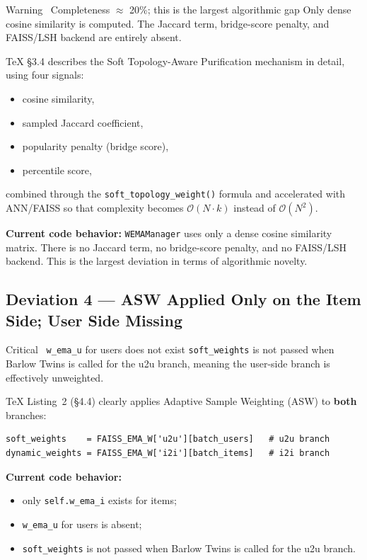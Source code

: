 \documentclass[11pt,a4paper]{article}
\begin{document}
\begin{warnbox}{Warning \textemdash\ Completeness $\approx$ 20\%; this is the largest algorithmic gap}
Only dense cosine similarity is computed. The Jaccard term, bridge-score penalty,
and FAISS/LSH backend are entirely absent.
\end{warnbox}

\TeX{} \S3.4 describes the Soft Topology-Aware Purification mechanism in detail, using four signals:
\begin{itemize}[leftmargin=1.5em, itemsep=2pt]
\item cosine similarity,
\item sampled Jaccard coefficient,
\item popularity penalty (bridge score),
\item percentile score,
\end{itemize}
combined through the \texttt{soft\_topology\_weight()} formula and accelerated with ANN/FAISS so that complexity becomes $\mathcal{O}(N \cdot k)$ instead of $\mathcal{O}(N^2)$.

\textbf{Current code behavior:} \texttt{WEMAManager} uses only a dense cosine similarity matrix.
There is no Jaccard term, no bridge-score penalty, and no FAISS/LSH backend.
This is the largest deviation in terms of algorithmic novelty.

\subsection{Deviation 4 --- ASW Applied Only on the Item Side; User Side Missing}

\begin{alertbox}{Critical \textemdash\ \texttt{w\_ema\_u} for users does not exist}
\texttt{soft\_weights} is not passed when Barlow Twins is called for the u2u branch,
meaning the user-side branch is effectively unweighted.
\end{alertbox}

\TeX{} Listing~2 (\S4.4) clearly applies Adaptive Sample Weighting (ASW) to \textbf{both} branches:

\begin{lstlisting}[style=mypython, caption={Expected ASW usage from \TeX{} Listing~2}]
soft_weights    = FAISS_EMA_W['u2u'][batch_users]   # u2u branch
dynamic_weights = FAISS_EMA_W['i2i'][batch_items]   # i2i branch
\end{lstlisting}

\textbf{Current code behavior:}
\begin{itemize}[leftmargin=1.5em, itemsep=2pt]
\item only \texttt{self.w\_ema\_i} exists for items;
\item \texttt{w\_ema\_u} for users is absent;
\item \texttt{soft\_weights} is not passed when Barlow Twins is called for the u2u branch.
\end{itemize}
\end{document}
